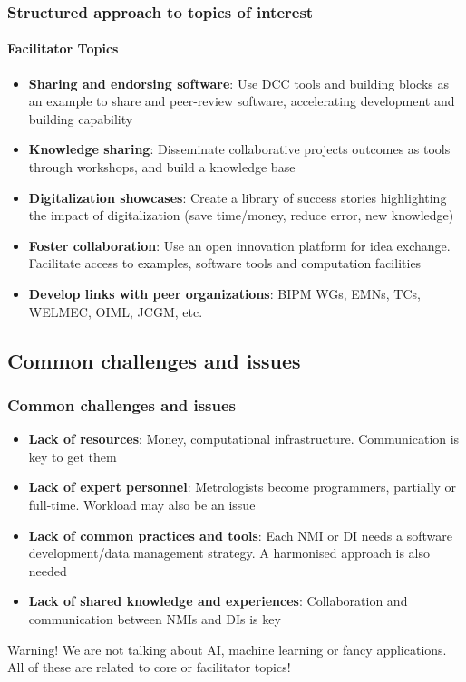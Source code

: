 \documentclass{beamer}
\begin{document}
    \begin{frame}
        \frametitle{Structured approach to topics of interest}
        \framesubtitle{Facilitator Topics}
        \begin{itemize}
            \item \textbf{Sharing and endorsing software}: Use DCC tools and building blocks as an example to share and peer-review software, accelerating development and building capability
            \item \textbf{Knowledge sharing}: Disseminate collaborative projects outcomes as tools through workshops, and build a knowledge base
            \item \textbf{Digitalization showcases}: Create a library of success stories highlighting the impact of digitalization (save time/money, reduce error, new knowledge)
            \item \textbf{Foster collaboration}: Use an open innovation platform for idea exchange. Facilitate access to examples, software tools and computation facilities
            \item \textbf{Develop links with peer organizations}: BIPM WGs, EMNs, TCs, WELMEC, OIML, JCGM, etc.
        \end{itemize}
    \end{frame}

    \subsection{Common challenges and issues}

    \begin{frame}
        \frametitle{Common challenges and issues}
        \begin{itemize}
            \item \textbf{Lack of resources}: Money, computational infrastructure. Communication is key to get them
            \item \textbf{Lack of expert personnel}: Metrologists become programmers, partially or full-time. Workload may also be an issue
            \item \textbf{Lack of common practices and tools}: Each NMI or DI needs a software development/data management strategy.
            A harmonised approach is also needed
            \item \textbf{Lack of shared knowledge and experiences}: Collaboration and communication between NMIs and DIs is key
        \end{itemize}
        \begin{alertblock}{Warning!}
            We are not talking about AI, machine learning or fancy applications.\\
            All of these are related to core or facilitator topics!
        \end{alertblock}
    \end{frame}
\end{document}
